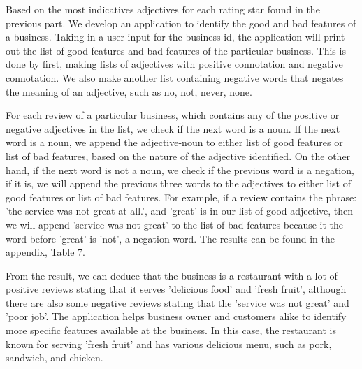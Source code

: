Based on the most indicatives adjectives for each rating star found in the previous part. We develop an application to identify the good and bad features of a business. Taking in a user input for the business id, the application will print out the list of good features and bad features of the particular business. This is done by first, making lists of adjectives with positive connotation and negative connotation. We also make another list containing negative words that negates the meaning of an adjective, such as no, not, never, none. 

For each review of a particular business, which contains any of the positive or negative adjectives in the list, we check if the next word is a noun. If the next word is a noun, we append the adjective-noun to either list of good features or list of bad features, based on the nature of the adjective identified. On the other hand, if the next word is not a noun, we check if the previous word is a negation, if it is, we will append the previous three words to the adjectives to either list of good features or list of bad features. For example, if a review contains the phrase: 'the service was not great at all.', and 'great' is in our list of good adjective, then we will append 'service was not great' to the list of bad features because it the word before 'great' is 'not', a negation word. The results can be found in the appendix, Table 7.

From the result, we can deduce that the business is a restaurant with a lot of positive reviews stating that it serves 'delicious food' and 'fresh fruit', although there are also some negative reviews stating that the 'service was not great' and 'poor job'. The application helps business owner and customers alike to identify more specific features available at the business. In this case, the restaurant is known for serving 'fresh fruit' and has various delicious menu, such as pork, sandwich, and chicken.
